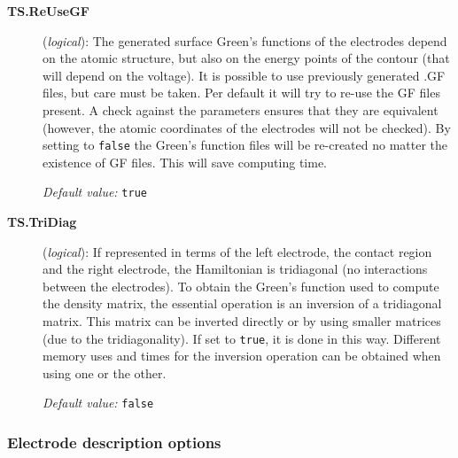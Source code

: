\documentclass[11pt]{article}
\newcommand\fdf[1]{%
    \textbf{#1}%
}
\begin{document}
\begin{description}
\item[\fdf{TS.ReUseGF}]  ({\it logical}): 
The generated surface Green's functions of the electrodes depend on the atomic structure,
but also on the energy points of the contour (that will depend on the voltage). 
It is possible to use previously generated .GF files, but care must be taken.
Per default it will try to re-use the GF files present. A check against the parameters
ensures that they are equivalent (however, the atomic coordinates of the electrodes will
not be checked). By setting to {\tt false} the Green's function files
will be re-created no matter the existence of GF files.
This will save computing time. 

{\it Default value:} {\tt true}

\item[{\bf TS.TriDiag}] ({\it logical}):  If represented in terms of the left electrode, the
  contact region and the right electrode, the Hamiltonian is
  tridiagonal (no interactions between the electrodes). To obtain the
  Green's function used to compute the density matrix, the essential
  operation is an inversion of a tridiagonal matrix. This matrix can
  be inverted directly or by using smaller matrices (due to the
  tridiagonality). If set to {\tt true}, it is done in this way.
  Different memory uses and times for the inversion operation can be
  obtained when using one or the other.

{\it Default value:} {\tt false}

\end{description}

\subsubsection{Electrode description options}
\end{document}
